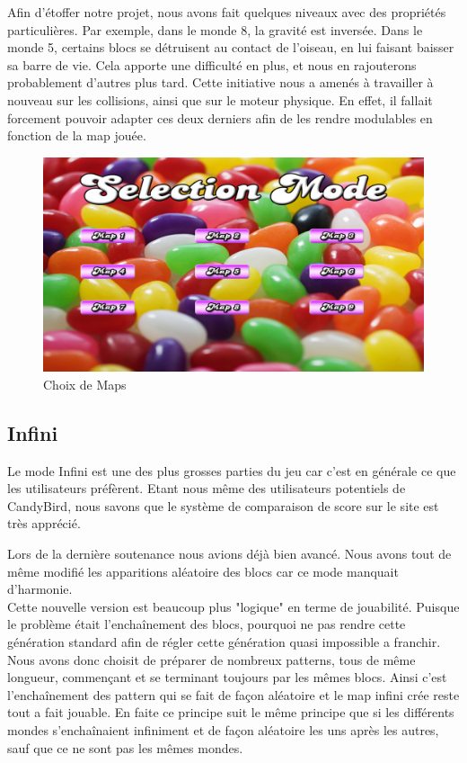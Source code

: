 \documentclass [11pt]{report}
\begin{document}
			\indent Afin d'étoffer notre projet, nous avons fait quelques niveaux avec des propriétés particulières. Par exemple, dans le monde 8, la gravité est inversée. Dans le monde 5, certains blocs se détruisent au contact de l'oiseau, en lui faisant baisser sa barre de vie. Cela apporte une difficulté en plus, et nous en rajouterons probablement d'autres plus tard. Cette initiative nous a amenés à travailler à nouveau sur les collisions, ainsi que sur le moteur physique. En effet, il fallait forcement pouvoir adapter ces deux derniers afin de les rendre modulables en fonction de la map jouée.							
			\begin{figure}[h]
				\centering
				\includegraphics[width=0.7\linewidth]{images/map_menu.png}
				\caption[Map Menu]{Choix de Maps}				
				\label{fig:Map Menu}
			\end{figure}
			\vspace{10mm}
			
		\subsection{Infini}
			Le mode Infini est une des plus grosses parties du jeu car c'est en générale ce que les utilisateurs préfèrent. Etant nous même des utilisateurs potentiels de CandyBird, nous savons que le système de comparaison de score sur le site est très apprécié.
						
			Lors de la dernière soutenance nous avions déjà bien avancé. Nous avons tout de même modifié les apparitions aléatoire des blocs car ce mode manquait d'harmonie.\\
						
						
			Cette nouvelle version est beaucoup plus "logique" en terme de jouabilité. Puisque le problème était l’enchaînement des blocs, pourquoi ne pas rendre cette génération standard afin de régler cette génération quasi impossible a franchir. Nous avons donc choisit de préparer de nombreux patterns, tous de même longueur, commençant et se terminant toujours par les mêmes blocs. Ainsi c'est l’enchaînement des pattern qui se fait de façon aléatoire et le map infini crée reste tout a fait jouable. En faite ce principe suit le même principe que si les différents mondes s’enchaînaient infiniment et de façon aléatoire les uns après les autres, sauf que ce ne sont pas les mêmes mondes.\\
			
\end{document}
